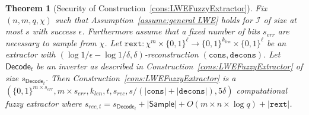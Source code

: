 \documentclass[11pt]{article}
\newcommand{\class}[1]{{\ensuremath{\mathsf{#1}}}}
\newcommand{\sample}{\ensuremath{\class{Sample}}\xspace}
\newcommand{\decode}{\ensuremath{\mathsf{Decode}}}
\newcommand{\rext}{\ensuremath{\mathtt{rext}}}
\newcommand{\cons}{\ensuremath{\mathtt{cons}}}
\newcommand{\decons}{\ensuremath{\mathtt{decons}}}
\newtheorem{theorem}{Theorem}[section]
\begin{document}
{\begin{theorem}[Security of Construction~\ref{cons:LWEFuzzyExtractor}]\label{thm:LWEFuzzyExtractor}
Fix $(n, m, q, \chi)$ such that Assumption~\ref{assume:general LWE} holds for $\mathcal{I}$ of size at most $s$ with success $\epsilon$.  Furthermore assume that a fixed number of bits $s_{err}$ are necessary to sample from $\chi$.  Let $\rext: \chi^m \times\{0,1\}^\ell\rightarrow \{0,1\}^{k_{len}}\times \{0,1\}^\ell$ be an extractor with $(\log 1/\epsilon - \log 1/\delta, \delta)$-reconstruction $(\cons,\decons)$.  Let $\decode_t$ be an inverter as described in Construction~\ref{cons:LWEFuzzyExtractor} of size $s_{\decode_t}$.  Then Construction~\ref{cons:LWEFuzzyExtractor} is a $(\{0,1\}^{m\times s_{err}}, m\times s_{err}, k_{len}, t, s_{rec}, s/(|\cons|+|\decons|), 5\delta)$ computational fuzzy extractor where $s_{rec, t} = s_{\decode_t}+ |\sample| + O(m\times n\times \log q) + |\rext|$.
\end{theorem}
}
\end{document}
